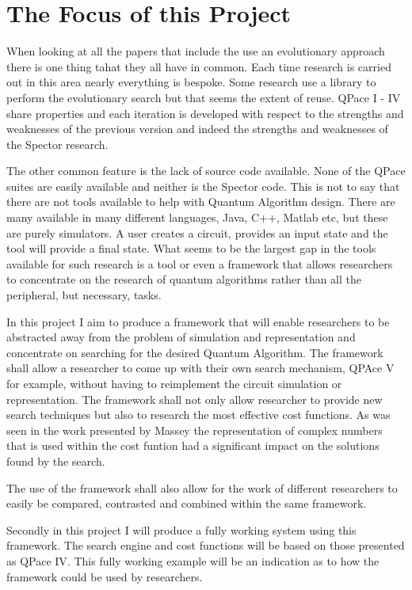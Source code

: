 \documentclass[authoryearcitations]{UoYCSproject}
\begin{document}
\section{The Focus of this Project}
When looking at all the papers that include the use an evolutionary approach there is one thing tahat they all have in common.
Each time research is carried out in this area nearly everything is bespoke.
Some research use a library to perform the evolutionary search but that seems the extent of reuse.
QPace I - IV share properties and each iteration is developed with respect to the strengths and weaknesses of the previous version and indeed the strengths and weaknesses of the Spector research.

The other common feature is the lack of source code available.
None of the QPace suites are easily available and neither is the Spector code.
This is not to say that there are not tools available to help with Quantum Algorithm design.
There are many available in many different languages, Java, C++, Matlab etc, but these are purely simulators.
A user creates a circuit, provides an input state and the tool will provide a final state.
What seems to be the largest gap in the tools available for such research is a tool or even a framework that allows researchers to concentrate on the research of quantum algorithms rather than all the peripheral, but necessary, tasks.

In this project I aim to produce a framework that will enable researchers to be abstracted away from the problem of simulation and representation and concentrate on searching for the desired Quantum Algorithm.
The framework shall allow a researcher to come up with their own search mechanism, QPAce V for example, without having to reimplement the circuit simulation or representation.
The framework shall not only allow researcher to provide new search techniques but also to research the most effective cost functions.
As was seen in the work presented by Massey\cite{masseythesis} the representation of complex numbers that is used within the cost funtion had a significant impact on the solutions found by the search.

The use of the framework shall also allow for the work of different researchers to easily be compared, contrasted and combined within the same framework.

Secondly in this project I will produce a fully working system using this framework.
The search engine and cost functions will be based on those presented as QPace IV\cite{masseythesis}.
This fully working example will be an indication as to how the framework could be used by researchers.
\end{document}
